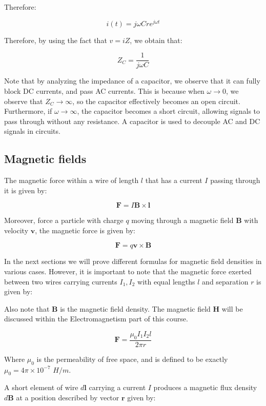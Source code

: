 \documentclass{article}
\begin{document}
\begin{proposition}
\begin{proposition}
    Therefore:

    \[ i(t) = j\omega Cre^{j\omega t} \]

    Therefore, by using the fact that $v = iZ$, we obtain that:

    \[ Z_C = \frac{1}{j\omega C} \]
\end{proposition}

Note that by analyzing the impedance of a capacitor, we observe that it can fully block DC currents, and pass AC currents. This is because when $\omega \to 0$, we observe that $Z_C \to \infty$, so the capacitor effectively becomes an open circuit. Furthermore, if $\omega \to \infty$, the capacitor becomes a short circuit, allowing signals to pass through without any resistance. A capacitor is used to decouple AC and DC signals in circuits.

\newpage

\subsection{Magnetic fields}

\begin{definition}
    The magnetic force within a wire of length $l$ that has a current $I$ passing through it is given by:

    \[ \mathbf{F} = I\mathbf{B} \times \mathbf{l} \]

    Moreover, force a particle with charge $q$ moving through a magnetic field $\mathbf{B}$ with velocity $\mathbf{v}$, the magnetic force is given by:

    \[ \mathbf{F} = q\mathbf{v} \times \mathbf{B} \]
\end{definition}

In the next sections we will prove different formulas for magnetic field densities in various cases. However, it is important to note that the magnetic force exerted between two wires carrying currents $I_1, I_2$ with equal lengths $l$ and separation $r$ is given by:

Also note that $\mathbf{B}$ is the magnetic field density. The magnetic field $\mathbf{H}$ will be discussed within the Electromagnetism part of this course.

\[ \mathbf{F} = \frac{\mu_0I_1I_2l}{2\pi r} \]

Where $\mu_0$ is the permeability of free space, and is defined to be exactly $\mu_0 = 4\pi \times 10^{-7}$ $H/m$.

\begin{theorem}
    A short element of wire $d\mathbf{l}$ carrying a current $I$ produces a magnetic flux density $d\mathbf{B}$ at a position described by vector $\mathbf{r}$ given by:


\end{theorem}
\end{proposition}
\end{document}
